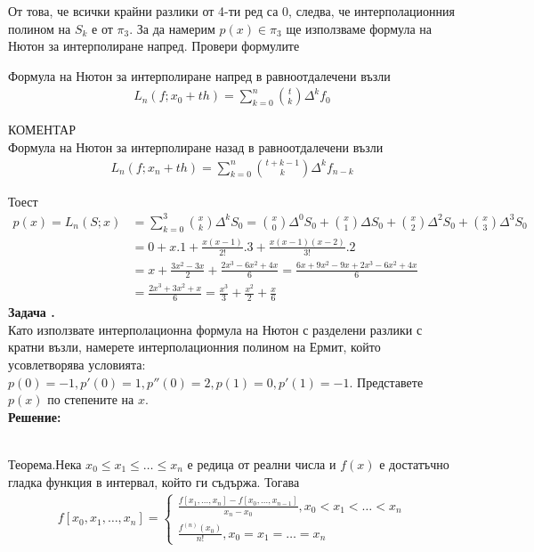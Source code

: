 \documentclass[12pt]{article}
\newcounter{problem}
\newcounter{solution}
\newcommand\problem{%
  \stepcounter{problem}%
  \textbf{Задача \theproblem.}~%
  \\
}
\newcommand\solution{%
  \textbf{Решение:}\\~%
}
\begin{document}
        От това, че всички крайни разлики от 4-ти ред са 0, следва, че интерполационния полином на $S_k$ е от $\pi_3$.
        За да намерим $p(x)\in\pi_3$ ще използваме формула на Нютон за интерполиране напред.
        Провери формулите
        \begin{tcolorbox}[colback=red!5!white,colframe=red!75!black]
        Формула на Нютон за интерполиране напред в равноотдалечени възли
        \begin{align*}
        L_n(f;x_0+th)=\sum_{k=0}^{n}{t \choose k}\Delta^kf_0
        \end{align*}
        \end{tcolorbox}
        \begin{tcolorbox}[colback=red!5!white,colframe=red!75!black]
        КОМЕНТАР\\
        Формула на Нютон за интерполиране назад в равноотдалечени възли
        \begin{align*}
        L_n(f;x_n+th)=\sum_{k=0}^{n}{t+k-1 \choose k}\Delta^kf_{n-k}
        \end{align*}
        \end{tcolorbox}
        Тоест 
        \begin{align*}
        p(x)=L_n(S;x)&=\sum_{k=0}^{3}{x \choose k}\Delta^kS_0 =
         {x \choose 0}\Delta^0S_0+{x \choose 1}\Delta S_0+{x \choose 2}\Delta^2S_0+{x \choose 3}\Delta^3S_0 \\
        &=0+x.1+\frac{x(x-1)}{2!}.3+\frac{x(x-1)(x-2)}{3!}.2 \\
        &= x+\frac{3x^2-3x}{2}+\frac{2x^3-6x^2+4x}{6}=\frac{6x+9x^2-9x+2x^3-6x^2+4x}{6}\\&=\frac{2x^3+3x^2+x}{6} =\boxed{\frac{x^3}{3}+\frac{x^2}{2} +\frac{x}{6}}
        \end{align*}
    \problem
        Като използвате интерполационна формула на Нютон с разделени разлики с кратни възли, намерете интерполационния полином на Ермит, който усовлетворява условията: $p(0) = -1, p'(0) = 1, p''(0)=2, p(1) =0,p'(1)=-1$. Представете $p(x)$ по степените на $x$.\\
    \solution
        \begin{tcolorbox}[colback=red!5!white,colframe=red!75!black]
        Теорема.Нека $x_0\leq x_1\leq\ldots\leq x_n$ е редица от реални числа и $f(x)$ е достатъчно гладка функция в интервал, който ги съдържа. Тогава
        \begin{align*}
        f[x_0,x_1,\ldots,x_n] = \begin{cases}
                                    \frac{f[x_1,\ldots,x_n]-f[x_0,\ldots,x_{n-1}]}{x_n-x_0},x_0<x_1<\ldots<x_n\\
                                    \frac{f^{(n)}(x_0)}{n!} , x_0=x_1=\ldots=x_n
                                \end{cases}
        \end{align*}
        \end{tcolorbox}
\end{document}
